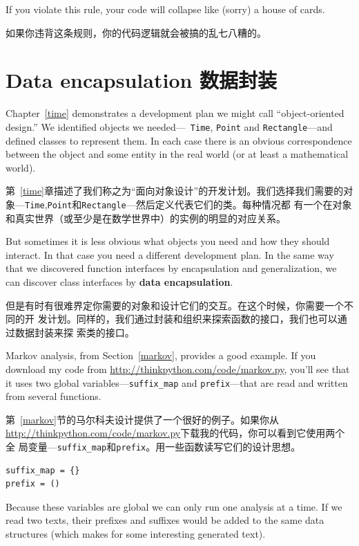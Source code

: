 \documentclass[10pt]{book}
\begin{document}
\begin{CJK}{UTF8}{gbsn}
If you violate this rule, your code will collapse like (sorry)
a house of cards.

如果你违背这条规则，你的代码逻辑就会被搞的乱七八糟的。


\section{Data encapsulation 数据封装}

Chapter~\ref{time} demonstrates a development plan we might call
``object-oriented design.''  We identified objects we needed---{\tt
  Time}, {\tt Point} and {\tt Rectangle}---and defined classes to
represent them.  In each case there is an obvious correspondence
between the object and some entity in the real world (or at least a
mathematical world).

第~\ref{time}章描述了我们称之为``面向对象设计''的开发计划。我们选择我们需要的对
象---{\tt Time},{\tt Point}和{\tt Rectangle}---然后定义代表它们的类。每种情况都
有一个在对象和真实世界（或至少是在数学世界中）的实例的明显的对应关系。

But sometimes it is less obvious what objects you need
and how they should interact.  In that case you need a different
development plan.  In the same way that we discovered function
interfaces by encapsulation and generalization, we can discover
class interfaces by {\bf data encapsulation}.

但是有时有很难界定你需要的对象和设计它们的交互。在这个时候，你需要一个不同的开
发计划。同样的，我们通过封装和组织来探索函数的接口，我们也可以通过数据封装来探
索类的接口。

Markov analysis, from Section~\ref{markov}, provides a good example.
If you download my code from \url{http://thinkpython.com/code/markov.py},
you'll see that it uses two global variables---\verb"suffix_map" and
\verb"prefix"---that are read and written from several functions.

第~\ref{markov}节的马尔科夫设计提供了一个很好的例子。如果你从
\url{http://thinkpython.com/code/markov.py}下载我的代码，你可以看到它使用两个全
局变量---\verb"suffix_map"和\verb"prefix"。用一些函数读写它们的设计思想。


\begin{verbatim}
suffix_map = {}        
prefix = ()            
\end{verbatim}

Because these variables are global
we can only run one analysis
at a time.  If we read two texts, their prefixes and suffixes would
be added to the same data structures (which makes for some interesting
generated text).


\end{CJK}
\end{document}
